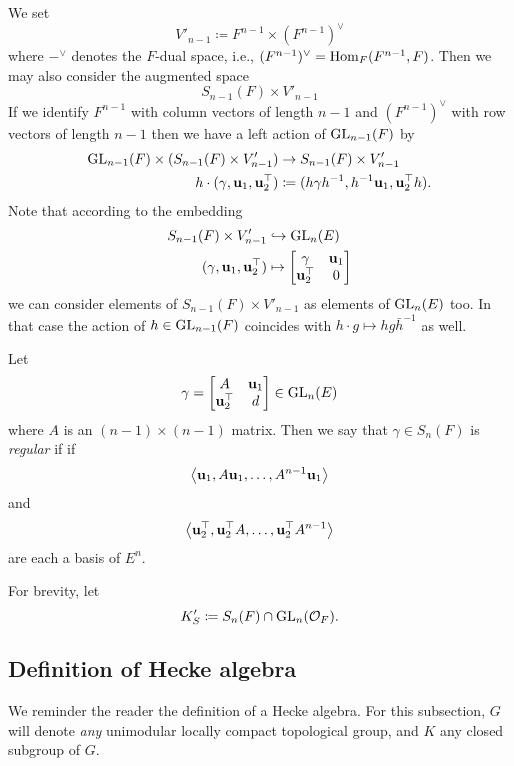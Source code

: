 \begin{definition}
  We set
  \[ V'_{n-1} \coloneqq F^{n-1} \times (F^{n-1})^\vee \]
  where $-^\vee$ denotes the $F$-dual space, i.e., $(F^{n-1})^\vee = \operatorname{Hom}_F(F^{n-1}, F)$.
  Then we may also consider the augmented space
  \[ S_{n-1}(F) \times V'_{n-1} \]
  If we identify $F^{n-1}$ with column vectors of length $n-1$ and $(F^{n-1})^\vee$
  with row vectors of length ${n-1}$ then we have a left action of $\operatorname{GL}_{n-1}(F)$ by
  \begin{align*}
    \operatorname{GL}_{n-1}(F) \times (S_{n-1}(F) \times V'_{n-1})
    &\to S_{n-1}(F) \times V'_{n-1} \\
    h \cdot (\gamma, \mathbf u_1, \mathbf u_2^\top)
    &\coloneqq (h \gamma h^{-1}, h^{-1}\mathbf u_1, \mathbf u_2^\top h).
  \end{align*}
  Note that according to the embedding
  \begin{align*}
    S_{n-1}(F) \times V'_{n-1}
    &\hookrightarrow \operatorname{GL}_n(E) \\
    (\gamma, \mathbf u_1, \mathbf u_2^\top)
    &\mapsto \begin{bmatrix} \gamma & \mathbf u_1 \\ \mathbf u_2^\top & 0 \end{bmatrix}
  \end{align*}
  we can consider elements of $S_{n-1}(F) \times V'_{n-1}$ as elements of $\operatorname{GL}_n(E)$ too.
  In that case the action of $h \in \operatorname{GL}_{n-1}(F)$
  coincides with $h \cdot g \mapsto hg\bar{h}^{-1}$ as well.
\end{definition}

\begin{definition}
  Let \[ \gamma = \begin{bmatrix} A & \mathbf u_1 \\ \mathbf u_2^\top & d \end{bmatrix} \in \operatorname{GL}_n(E) \]
  where $A$ is an $(n-1) \times (n-1)$ matrix.
  Then we say that $\gamma \in S_n(F)$ is \emph{regular} if
  if \[ \left< \mathbf u_1, A\mathbf u_1, \dots, A^{n-1}\mathbf u_1 \right> \]
  and \[ \left< \mathbf u_2^\top, \mathbf u_2^\top A, \dots, \mathbf u_2^\top A^{n-1} \right> \]
  are each a basis of $E^n$.
\end{definition}

\begin{definition}
  For brevity, let
   \[ K'_S \coloneqq S_n(F) \cap \operatorname{GL}_n(\mathcal O_F). \]
\end{definition}

\subsection{Definition of Hecke algebra}
We reminder the reader the definition of a Hecke algebra.
For this subsection, $G$ will denote \emph{any}
unimodular locally compact topological group,
and $K$ any closed subgroup of $G$.

